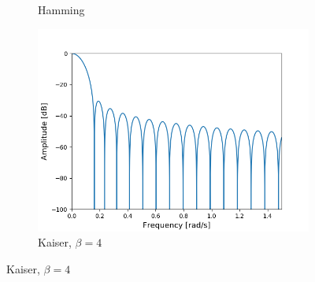 \begin{figure}[H]
\begin{subfigure}{0.49\textwidth}
\caption{Hamming}
\centering
\includegraphics[width=\textwidth]{figures/dbplots/stft_bilag/64/kaiser4.png}
\caption{Kaiser, $\beta=4$}
\end{subfigure}


\end{figure}
